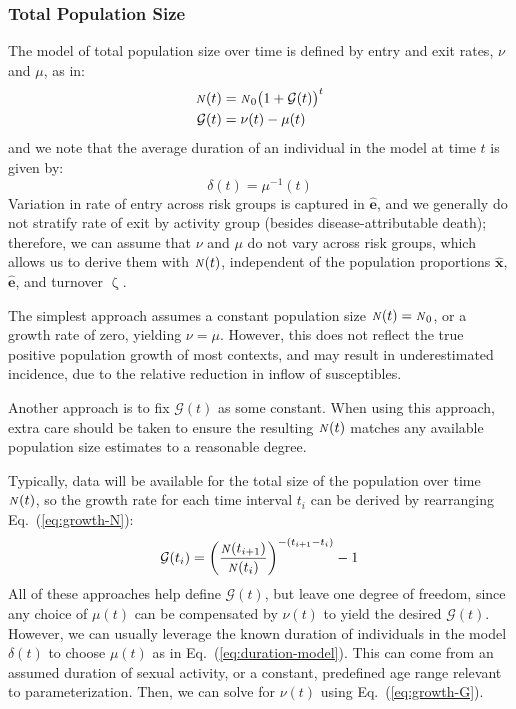 \documentclass[10pt]{article}
\numberwithin{equation}{section}
\renewcommand{\zeta}{\upzeta}
\newcommand{\N}{{\mbox{\footnotesize{\textit{N}}}}}
\newcommand{\eq}[1]{Eq.~(\ref{#1})}
\begin{document}
\subsubsection{Total Population Size}\label{sss:params-nu-mu}
%  
The model of total population size over time is defined by
entry and exit rates, $\nu$ and $\mu$, as in:
\begin{subequations}
  \begin{align}
  \N(t) &= \N_0 {\big(1+\mathcal{G}(t)\big)}^{t} \label{eq:growth-N}\\
  \mathcal{G}(t) &= \nu(t) - \mu(t)              \label{eq:growth-G}
  \end{align}
\end{subequations}
and we note that the average duration of an individual in the model at time $t$
is given by:
\begin{equation} \label{eq:duration-model}
  \delta(t) = \mu^{-1}(t)
\end{equation}
Variation in rate of entry across risk groups is captured in $\bm{\hat{e}}$,
and we generally do not stratify rate of exit by activity group
(besides disease-attributable death);
therefore, we can assume that $\nu$ and $\mu$ do not vary across risk groups,
which allows us to derive them with $\N(t)$, independent of
the population proportions $\bm{\hat{x}}$, $\bm{\hat{e}}$, and turnover $\zeta$.
\par
The simplest approach assumes a constant population size $\N(t) = \N_0$,
or a growth rate of zero, yielding $\nu = \mu$.
However, this does not reflect the true positive population growth of most contexts,
and may result in underestimated incidence,
due to the relative reduction in inflow of susceptibles.
\par
Another approach is to fix $\mathcal{G}(t)$ as some constant.
When using this approach, extra care should be taken to ensure
the resulting $\N(t)$ matches any available population size estimates to a reasonable degree.
\par
Typically, data will be available for the total size of the population over time $\N(t)$,
so the growth rate for each time interval $t_i$
can be derived by rearranging \eq{eq:growth-N}:
\begin{equation}
\mathcal{G}(t_i) = {\left(\frac{\N(t_{i+1})}{\N(t_{i})}\right)}^{-(t_{i+1}-t_i)} - 1
\end{equation}
All of these approaches help define $\mathcal{G}(t)$, but leave one degree of freedom,
since any choice of $\mu(t)$ can be compensated by $\nu(t)$ to yield the desired $\mathcal{G}(t)$.
However, we can usually leverage the known duration of individuals in the model $\delta(t)$
to choose $\mu(t)$ as in \eq{eq:duration-model}.
This can come from an assumed duration of sexual activity,
or a constant, predefined age range relevant to parameterization.
Then, we can solve for $\nu(t)$ using \eq{eq:growth-G}.
\end{document}
